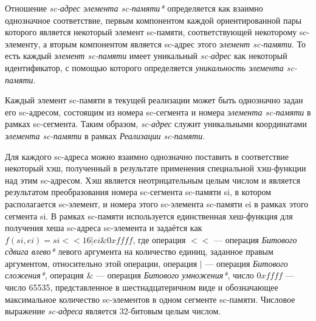 Отношение \textit{sc-адрес элемента sc-памяти*} определяется как взаимно однозначное соответствие, первым компонентом каждой ориентированной пары которого является некоторый элемент sc-памяти, соответствующей некоторому sc-элементу, а вторым компонентом является sc-адрес этого \textit{элемент sc-памяти}. То есть каждый \textit{элемент sc-памяти} имеет уникальный \textit{sc-адрес} как некоторый идентификатор, с помощью которого определяется \textit{уникальность элемента sc-памяти}.

Каждый элемент sc-памяти в текущей реализации может быть однозначно задан его sc-адресом, состоящим из номера sc-сегмента и номера \textit{элемента sc-памяти} в рамках sc-сегмента. Таким образом, \textit{sc-адрес} служит уникальными координатами \textit{элемента sc-памяти} в рамках \textit{Реализации sc-памяти}.

Для каждого sc-адреса можно взаимно однозначно поставить в соответствие некоторый хэш, полученный в результате применения специальной хэш-функции над этим sc-адресом. Хэш является неотрицательным целым числом и является результатом преобразования номера sc-сегмента sc-памяти si, в котором располагается sc-элемент, и номера этого sc-элемента sc-памяти ei в рамках этого сегмента si. В рамках sc-памяти используется единственная хеш-функция для получения хеша sc-адреса sc-элемента и задаётся как $f(si, ei) = si << 16 | ei \& 0xffff$, где операция $<<$ --- операция \textit{Битового сдвига влево*} левого аргумента на количество единиц, заданное правым аргументом, относительно этой операции, операция $|$ --- операция \textit{Битового сложения*}, операция $\&$ --- операция \textit{Битового умножения*}, число $0xffff$ --- число 65535, представленное в шестнадцатеричном виде и обозначающее максимальное количество sc-элементов в одном сегменте sc-памяти. Числовое выражение \textit{sc-адреса} является 32-битовым целым числом.

\begin{SCn}
\end{SCn}

